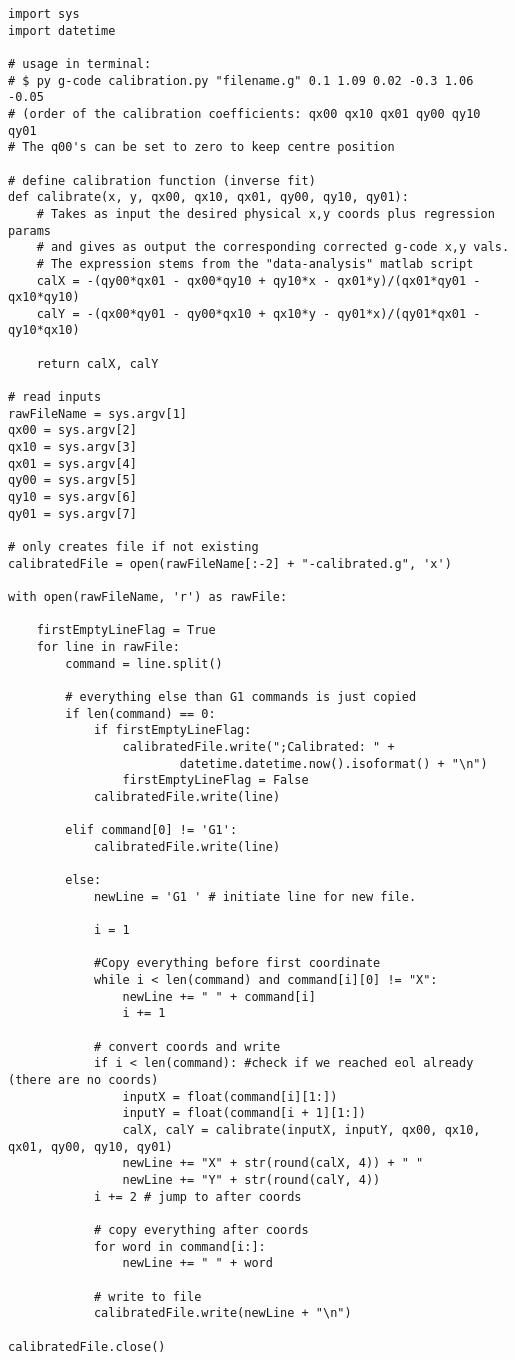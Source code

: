 \begin{verbatim}
import sys
import datetime

# usage in terminal:
# $ py g-code calibration.py "filename.g" 0.1 1.09 0.02 -0.3 1.06 -0.05
# (order of the calibration coefficients: qx00 qx10 qx01 qy00 qy10 qy01
# The q00's can be set to zero to keep centre position

# define calibration function (inverse fit)
def calibrate(x, y, qx00, qx10, qx01, qy00, qy10, qy01):
    # Takes as input the desired physical x,y coords plus regression params
    # and gives as output the corresponding corrected g-code x,y vals.
    # The expression stems from the "data-analysis" matlab script
    calX = -(qy00*qx01 - qx00*qy10 + qy10*x - qx01*y)/(qx01*qy01 - qx10*qy10)
    calY = -(qx00*qy01 - qy00*qx10 + qx10*y - qy01*x)/(qy01*qx01 - qy10*qx10)

    return calX, calY

# read inputs
rawFileName = sys.argv[1]
qx00 = sys.argv[2]
qx10 = sys.argv[3]
qx01 = sys.argv[4]
qy00 = sys.argv[5]
qy10 = sys.argv[6]
qy01 = sys.argv[7]

# only creates file if not existing
calibratedFile = open(rawFileName[:-2] + "-calibrated.g", 'x') 

with open(rawFileName, 'r') as rawFile:

    firstEmptyLineFlag = True
    for line in rawFile:
        command = line.split()

        # everything else than G1 commands is just copied
        if len(command) == 0:
            if firstEmptyLineFlag: 
                calibratedFile.write(";Calibrated: " +
                        datetime.datetime.now().isoformat() + "\n")
                firstEmptyLineFlag = False
            calibratedFile.write(line)

        elif command[0] != 'G1':
            calibratedFile.write(line)

        else:
            newLine = 'G1 ' # initiate line for new file.

            i = 1

            #Copy everything before first coordinate
            while i < len(command) and command[i][0] != "X":
                newLine += " " + command[i] 
                i += 1

            # convert coords and write
            if i < len(command): #check if we reached eol already (there are no coords)
                inputX = float(command[i][1:])
                inputY = float(command[i + 1][1:])
                calX, calY = calibrate(inputX, inputY, qx00, qx10, qx01, qy00, qy10, qy01)
                newLine += "X" + str(round(calX, 4)) + " "
                newLine += "Y" + str(round(calY, 4))
            i += 2 # jump to after coords

            # copy everything after coords
            for word in command[i:]:
                newLine += " " + word

            # write to file
            calibratedFile.write(newLine + "\n")

calibratedFile.close()

\end{verbatim}
